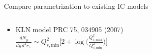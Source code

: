 \documentclass[xcolor=dvipsnames]{beamer}
\begin{document}
\begin{frame}{Compare parametrization to existing IC models}
\begin{columns}[T]
\begin{column}{0.58\textwidth}
\begin{itemize}
{                      PRC 93, 024907 (2016)} \\
                      {\scriptsize after brief free streaming phase} \\[1em] 
                      $\displaystyle \frac{dE_T}{dy\,d^2r_\perp}  \sim 
                      \frac{K_\text{sat}}{\pi} p_\text{sat}^3(K_\text{sat}, 
                      \beta; T_A, T_B)$
                \item KLN model \; {\scriptsize \color{theme} PRC 75, 
                     034905 (2007)} \\[1em] $\displaystyle 
                     \frac{dN_g}{dy\,d^2r_\perp} \sim Q^2_{s,\text{min}} \bigg[2 + 
                     \log \bigg(\frac{Q^2_{s,\text{max}}}{Q^2_{s,\text{min}}}
                     \bigg) \bigg]$
            \end{itemize}
            \centering
        \end{column}
        \begin{column}{0.02\textwidth}
        \end{column}
    \end{columns}
\end{frame}
\end{document}
